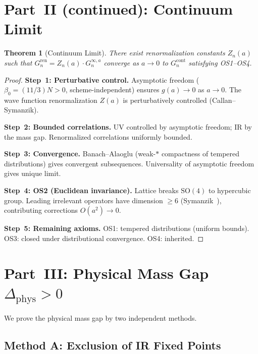 \documentclass[12pt,a4paper]{article}
\theoremstyle{plain}
\newtheorem{theorem}{Theorem}[section]
\theoremstyle{definition}
\theoremstyle{remark}
\begin{document}
\section{Part~II (continued): Continuum Limit}\label{sec:contlim}

\begin{theorem}[Continuum Limit]\label{thm:cont}
There exist renormalization constants $Z_n(a)$ such that $G_n^{\mathrm{ren}}=Z_n(a)\cdot G_n^{\infty,a}$ converge as $a\to 0$ to $G_n^{\mathrm{cont}}$ satisfying OS1--OS4.
\end{theorem}

\begin{proof}
\textbf{Step~1: Perturbative control.} Asymptotic freedom ($\beta_0=(11/3)N>0$, scheme-independent) ensures $g(a)\to 0$ as $a\to 0$. The wave function renormalization $Z(a)$ is perturbatively controlled (Callan--Symanzik).

\textbf{Step~2: Bounded correlations.} UV controlled by asymptotic freedom; IR by the mass gap. Renormalized correlations uniformly bounded.

\textbf{Step~3: Convergence.} Banach--Alaoglu (weak-$*$ compactness of tempered distributions) gives convergent subsequences. Universality of asymptotic freedom gives unique limit.

\textbf{Step~4: OS2 (Euclidean invariance).} Lattice breaks $\mathrm{SO}(4)$ to hypercubic group. Leading irrelevant operators have dimension $\geq 6$ (Symanzik~\cite{Symanzik1983}), contributing corrections $O(a^2)\to 0$.

\textbf{Step~5: Remaining axioms.} OS1: tempered distributions (uniform bounds). OS3: closed under distributional convergence. OS4: inherited.
\end{proof}

\section{Part~III: Physical Mass Gap $\Delta_{\mathrm{phys}}>0$}\label{sec:physgap}

We prove the physical mass gap by two independent methods.

\subsection{Method A: Exclusion of IR Fixed Points}\label{sec:methodA}
\end{document}
